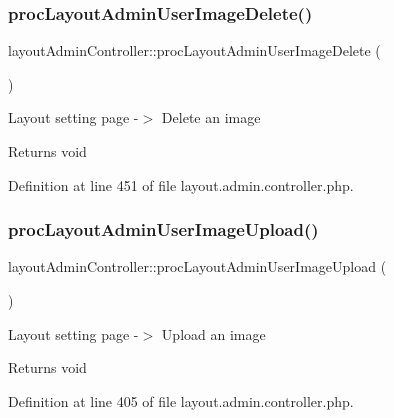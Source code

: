\subsubsection{\texorpdfstring{proc\+Layout\+Admin\+User\+Image\+Delete()}{procLayoutAdminUserImageDelete()}}
{\footnotesize\ttfamily layout\+Admin\+Controller\+::proc\+Layout\+Admin\+User\+Image\+Delete (\begin{DoxyParamCaption}{ }\end{DoxyParamCaption})}

Layout setting page -\/$>$ Delete an image \begin{DoxyReturn}{Returns}
void 
\end{DoxyReturn}


Definition at line 451 of file layout.\+admin.\+controller.\+php.

\hypertarget{classlayoutAdminController_a8883afdc3e36df910ff5c950d94f5919}{}\label{classlayoutAdminController_a8883afdc3e36df910ff5c950d94f5919} 
\subsubsection{\texorpdfstring{proc\+Layout\+Admin\+User\+Image\+Upload()}{procLayoutAdminUserImageUpload()}}
{\footnotesize\ttfamily layout\+Admin\+Controller\+::proc\+Layout\+Admin\+User\+Image\+Upload (\begin{DoxyParamCaption}{ }\end{DoxyParamCaption})}

Layout setting page -\/$>$ Upload an image \begin{DoxyReturn}{Returns}
void 
\end{DoxyReturn}


Definition at line 405 of file layout.\+admin.\+controller.\+php.

\hypertarget{classlayoutAdminController_a51cfe704e67bb01f9f3e471f097e5684}{}\label{classlayoutAdminController_a51cfe704e67bb01f9f3e471f097e5684} 

